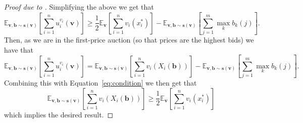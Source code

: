 \begin{proof}[Proof due to \cite{10.1145/2488608.2488634}]
  Simplifying the above we get that
  \begin{equation}
    \mathbb{E}_{\mathbf{v}, \mathbf{b} \sim \mathbf{s}(\mathbf{v})} \left[ \sum_{i = 1}^{n} u_i^{v_i}(\mathbf{v}) \right] \geq \frac{1}{2}\mathbb{E}_{\mathbf{v}}\left[ \sum_{i = 1}^{n} v_i(x_i^{*}) \right] - \mathbb{E}_{\mathbf{v, \mathbf{b} \sim \mathbf{s}(\mathbf{v})}}\left[ \sum_{j = 1}^{m} \max_{k}b_k(j) \right].
    \label{eq:condition}
  \end{equation}
  Then, as we are in the first-price auction (so that prices are the highest bids) we have that
  \begin{equation}
    \mathbb{E}_{\mathbf{v}, \mathbf{b} \sim \mathbf{s}(\mathbf{v})} \left[ \sum_{i = 1}^{n} u_i^{v_i}(\mathbf{v}) \right] = \mathbb{E}_{\mathbf{v}, \mathbf{b} \sim \mathbf{s}(\mathbf{v})}\left[\sum_{i = 1}^{n} v_i(X_i(\mathbf{b}))\right] - \mathbb{E}_{\mathbf{v}, \mathbf{b} \sim \mathbf{s}(\mathbf{v})}\left[ \sum_{j = 1}^{m} \max_{k}b_k(j) \right].
  \end{equation}
  Combining this with Equation~\ref{eq:condition} we then get that
  \begin{equation}
    \mathbb{E}_{\mathbf{v}, \mathbf{b} \sim \mathbf{s}(\mathbf{v})}\left[\sum_{i = 1}^{n} v_i(X_i(\mathbf{b}))\right] \geq \frac{1}{2}\mathbb{E}_{\mathbf{v}}\left[ \sum_{i = 1}^{n} v_i(x_i^{*}) \right]
  \end{equation}
  which implies the desired result.
\end{proof}

